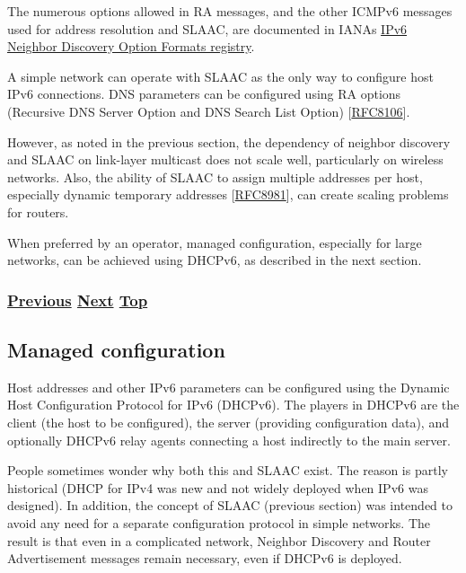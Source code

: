 \documentclass[
]{article}
\begin{document}
The numerous options allowed in RA messages, and the other ICMPv6
messages used for address resolution and SLAAC, are documented in
IANA\textquotesingle s
\href{https://www.iana.org/assignments/icmpv6-parameters/icmpv6-parameters.xhtml\#icmpv6-parameters-5}{IPv6
Neighbor Discovery Option Formats registry}.

A simple network can operate with SLAAC as the only way to configure
host IPv6 connections. DNS parameters can be configured using RA options
(Recursive DNS Server Option and DNS Search List Option)
{[}\href{https://www.rfc-editor.org/info/rfc8106}{RFC8106}{]}.

However, as noted in the previous section, the dependency of neighbor
discovery and SLAAC on link-layer multicast does not scale well,
particularly on wireless networks. Also, the ability of SLAAC to assign
multiple addresses per host, especially dynamic temporary addresses
{[}\href{https://www.rfc-editor.org/info/rfc8981}{RFC8981}{]}, can
create scaling problems for routers.

When preferred by an operator, managed configuration, especially for
large networks, can be achieved using DHCPv6, as described in the next
section.

\subsubsection{\texorpdfstring{\hyperref[address-resolution]{Previous}
\hyperref[managed-configuration]{Next}
\hyperref[ipv6-basic-technology]{Top}}{Previous Next Top}}\label{previous-next-top-11}

\pagebreak

\subsection{Managed configuration}\label{managed-configuration}

Host addresses and other IPv6 parameters can be configured using the
Dynamic Host Configuration Protocol for IPv6 (DHCPv6). The players in
DHCPv6 are the client (the host to be configured), the server (providing
configuration data), and optionally DHCPv6 relay agents connecting a
host indirectly to the main server.

People sometimes wonder why both this and SLAAC exist. The reason is
partly historical (DHCP for IPv4 was new and not widely deployed when
IPv6 was designed). In addition, the concept of SLAAC (previous section)
was intended to avoid any need for a separate configuration protocol in
simple networks. The result is that even in a complicated network,
Neighbor Discovery and Router Advertisement messages remain necessary,
even if DHCPv6 is deployed.
\end{document}
